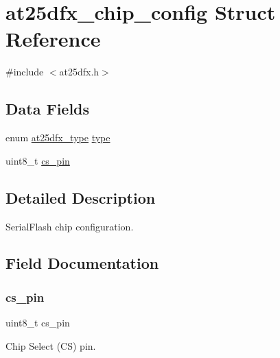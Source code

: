 \hypertarget{structat25dfx__chip__config}{}\section{at25dfx\+\_\+chip\+\_\+config Struct Reference}
\label{structat25dfx__chip__config}


{\ttfamily \#include $<$at25dfx.\+h$>$}

\subsection*{Data Fields}
\begin{DoxyCompactItemize}
\item 
enum \mbox{\hyperlink{group__asfdoc__common2__at25dfx__group_ga98ba30dd90f741beb7f8d47e7725471d}{at25dfx\+\_\+type}} \mbox{\hyperlink{structat25dfx__chip__config_a71bd7aaba8d2006d07410e3ee92755db}{type}}
\item 
uint8\+\_\+t \mbox{\hyperlink{structat25dfx__chip__config_aed65b23a4e5c39c4267c5730833e70db}{cs\+\_\+pin}}
\end{DoxyCompactItemize}


\subsection{Detailed Description}
Serial\+Flash chip configuration. 

\subsection{Field Documentation}
\mbox{\label{structat25dfx__chip__config_aed65b23a4e5c39c4267c5730833e70db}} 
\subsubsection{\texorpdfstring{cs\_pin}{cs\_pin}}
{\footnotesize\ttfamily uint8\+\_\+t cs\+\_\+pin}

Chip Select (CS) pin. \mbox{\label{structat25dfx__chip__config_a71bd7aaba8d2006d07410e3ee92755db}} 
